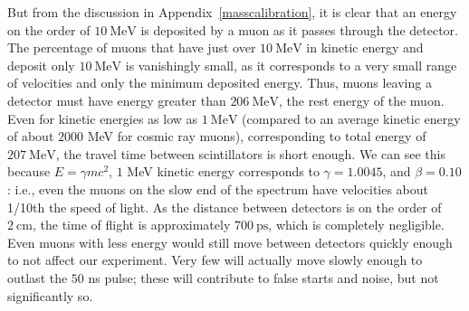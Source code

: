 But from the discussion in Appendix~\ref{masscalibration}, it is clear that an energy on the order of $10~\mathrm{MeV}$ is deposited by a muon as it passes through the detector. The percentage of muons that have just over $10~\mathrm{MeV}$ in kinetic energy and deposit only $10~\mathrm{MeV}$ is vanishingly small, as it corresponds to a very small range of velocities and only the minimum deposited energy. Thus, muons leaving a detector must have energy greater than $206~\mathrm{MeV}$, the rest energy of the muon. Even for kinetic energies as low as $1~\mathrm{MeV}$ (compared to an average kinetic energy of about $2000$ MeV for cosmic ray muons), corresponding to total energy of $207~\mathrm{MeV}$, the travel time between scintillators is short enough. We can see this because $E = \gamma mc^2$, $1$ MeV kinetic energy corresponds to $\gamma = 1.0045$, and $\beta = 0.10$: i.e., even the muons on the slow end of the spectrum have velocities about 1/10th the speed of light. As the distance between detectors is on the order of $2~\mathrm{cm}$, the time of flight is approximately $700~\mathrm{ps}$, which is completely negligible. Even muons with less energy would still move between detectors quickly enough to not affect our experiment. Very few will actually move slowly enough to outlast the $50$ ns pulse; these will contribute to false starts and noise, but not significantly so. 